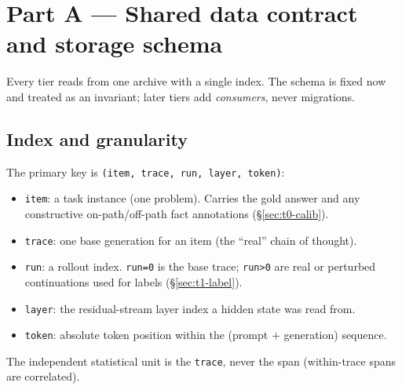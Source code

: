 \documentclass[11pt]{article}
\newcommand{\out}[1]{\texttt{#1}}      %
\begin{document}
\section{Part A --- Shared data contract and storage schema}
\label{sec:contract}

Every tier reads from one archive with a single index. The schema is fixed now and
treated as an invariant; later tiers add \emph{consumers}, never migrations.

\subsection{Index and granularity}
The primary key is \out{(item, trace, run, layer, token)}:
\begin{itemize}[leftmargin=1.4em,itemsep=1pt]
\item \out{item}: a task instance (one problem). Carries the gold answer and any
constructive on-path/off-path fact annotations (\S\ref{sec:t0-calib}).
\item \out{trace}: one base generation for an item (the ``real'' chain of thought).
\item \out{run}: a rollout index. \out{run=0} is the base trace; \out{run>0} are
real or perturbed continuations used for labels (\S\ref{sec:t1-label}).
\item \out{layer}: the residual-stream layer index a hidden state was read from.
\item \out{token}: absolute token position within the (prompt $+$ generation)
sequence.
\end{itemize}
The independent statistical unit is the \out{trace}, never the span (within-trace
spans are correlated).
\end{document}
